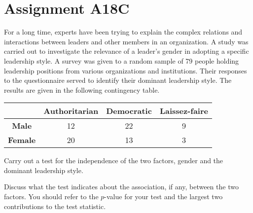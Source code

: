 \section{Assignment A18C}

\begin{problem}
    For a long time, experts have been trying to explain the complex relations and interactions between leaders and other members in an organization. A study was carried out to investigate the relevance of a leader's gender in adopting a specific leadership style. A survey was given to a random sample of 79 people holding leadership positions from various organizations and institutions. Their responses to the questionnaire served to identify their dominant leadership style. The results are given in the following contingency table.

    \begin{table}[H]
        \centering
        \begin{tabular}{|c|c|c|c|}
            \hline
            & \textbf{Authoritarian} & \textbf{Democratic} & \textbf{Laissez-faire} \\ \hline
            \textbf{Male} & 12 & 22 & 9 \\ \hline
            \textbf{Female} & 20 & 13 & 3 \\ \hline
        \end{tabular}
    \end{table}

    Carry out a test for the independence of the two factors, gender and the dominant leadership style.

    Discuss what the test indicates about the association, if any, between the two factors. You should refer to the $p$-value for your test and the largest two contributions to the test statistic.
\end{problem}
